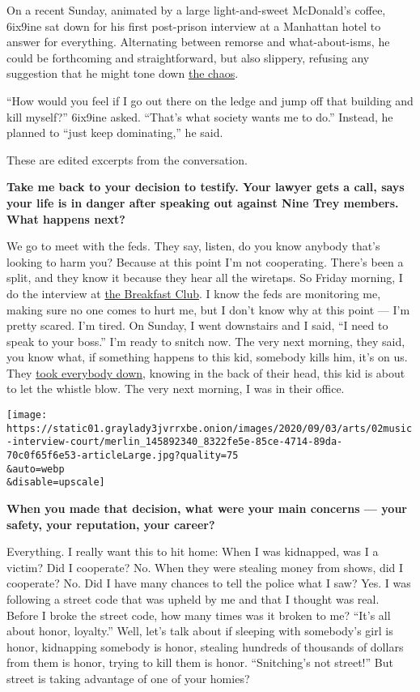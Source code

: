 On a recent Sunday, animated by a large light-and-sweet McDonald's
coffee, 6ix9ine sat down for his first post-prison interview at a
Manhattan hotel to answer for everything. Alternating between remorse
and what-about-isms, he could be forthcoming and straightforward, but
also slippery, refusing any suggestion that he might tone down
\href{https://www.nytimes3xbfgragh.onion/2020/05/20/arts/music/6ix9ine-chaos-internet.html}{the
chaos}.

``How would you feel if I go out there on the ledge and jump off that
building and kill myself?'' 6ix9ine asked. ``That's what society wants
me to do.'' Instead, he planned to ``just keep dominating,'' he said.

These are edited excerpts from the conversation.

\textbf{Take me back to your decision to testify. Your lawyer gets a
call, says your life is in danger after speaking out against Nine Trey
members. What happens next?}

We go to meet with the feds. They say, listen, do you know anybody
that's looking to harm you? Because at this point I'm not cooperating.
There's been a split, and they know it because they hear all the
wiretaps. So Friday morning, I do the interview at
\href{https://www.youtube.com/watch?v=RQ8NoQTT1fQ}{the Breakfast Club}.
I know the feds are monitoring me, making sure no one comes to hurt me,
but I don't know why at this point --- I'm pretty scared. I'm tired. On
Sunday, I went downstairs and I said, ``I need to speak to your boss.''
I'm ready to snitch now. The very next morning, they said, you know
what, if something happens to this kid, somebody kills him, it's on us.
They
\href{https://www.nytimes3xbfgragh.onion/2018/11/19/nyregion/tekashi-6ix9ine-arrested-racketeering.html}{took
everybody down}, knowing in the back of their head, this kid is about to
let the whistle blow. The very next morning, I was in their office.

\texttt{[image: https://static01.graylady3jvrrxbe.onion/images/2020/09/03/arts/02music-interview-court/merlin\_145892340\_8322fe5e-85ce-4714-89da-70c0f65f6e53-articleLarge.jpg?quality=75\\\&auto=webp\\\&disable=upscale]}

\textbf{When you made that decision, what were your main concerns ---
your safety, your reputation, your career?}

Everything. I really want this to hit home: When I was kidnapped, was I
a victim? Did I cooperate? No. When they were stealing money from shows,
did I cooperate? No. Did I have many chances to tell the police what I
saw? Yes. I was following a street code that was upheld by me and that I
thought was real. Before I broke the street code, how many times was it
broken to me? ``It's all about honor, loyalty.'' Well, let's talk about
if sleeping with somebody's girl is honor, kidnapping somebody is honor,
stealing hundreds of thousands of dollars from them is honor, trying to
kill them is honor. ``Snitching's not street!'' But street is taking
advantage of one of your homies?

